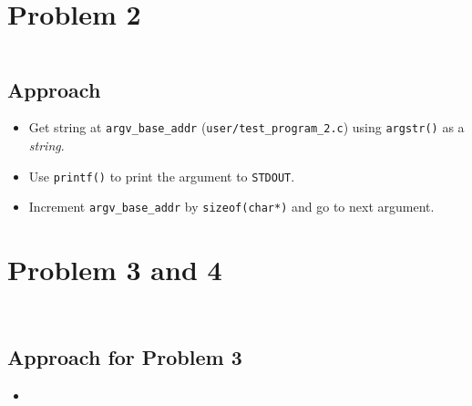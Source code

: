 \documentclass[11pt,a4paper,english]{paper}
\newenvironment{colorboxed}[4][gray]{
\begin{tcolorbox}[colback=#1!3!white,colframe=#1(ryb)!50!black,title=\textbf{#2: #3},#4]
}{
\end{tcolorbox}
}
\begin{document}
\section*{Problem 2}
\begin{colorboxed}{Code}{\texttt{kernel/sysproc.c::\textit{sys\_echo\_kernel()}}}{breakable}
    \inputminted[baselinestretch=0.85,firstline=119,lastline=143,breaklines]{c}{kernel/sysproc.c}
\end{colorboxed}
\subsection*{Approach}
\begin{itemize}[noitemsep, nolistsep]
    \item Get string at \texttt{argv\_base\_addr} (\texttt{user/test\_program\_2.c}) using \texttt{argstr()} as a \textit{string}.
    \item Use \texttt{printf()} to print the argument to \texttt{STDOUT}.
    \item Increment \texttt{argv\_base\_addr} by \texttt{sizeof(char*)} and go to next argument.
\end{itemize}
\section*{Problem 3 and 4}
\begin{colorboxed}{Code}{\texttt{kernel/sysproc.c::\textit{sys\_trace()}}}{unbreakable}
    \inputminted[baselinestretch=0.85,firstline=145,lastline=155,breaklines]{c}{kernel/sysproc.c}
\end{colorboxed}
\begin{colorboxed}{Code}{\texttt{kernel/syscall.c::\textit{syscall()}}}{unbreakable}
    \inputminted[baselinestretch=0.85,firstline=156,lastline=175,breaklines]{c}{kernel/syscall.c}
\end{colorboxed}
\subsection*{Approach for Problem 3}
\begin{itemize}[noitemsep, nolistsep]
    \item
\end{itemize}
\end{document}
